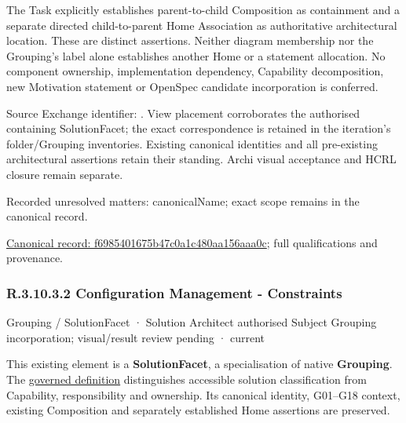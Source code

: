 The Task explicitly establishes parent-to-child Composition as containment and
a separate directed child-to-parent Home Association as authoritative architectural
location. These are distinct assertions. Neither diagram membership nor the
Grouping's label alone establishes another Home or a statement allocation.
No component ownership, implementation dependency, Capability decomposition,
new Motivation statement or OpenSpec candidate incorporation is conferred.



Source Exchange identifier: \texttt{}. View placement corroborates
the authorised containing SolutionFacet; the exact correspondence is retained in the
iteration's folder/Grouping inventories. Existing canonical identities and all
pre-existing architectural assertions retain their standing. Archi visual
acceptance and HCRL closure remain separate.


{\small Recorded unresolved matters: canonicalName; exact scope remains in the canonical record.}\par
{\footnotesize \href{../../../../../../../continuum/grouping/f6985401675b47c0a1c480aa156aaa0c.md}{Canonical record: f6985401675b47c0a1c480aa156aaa0c}; full qualifications and provenance.}\par
\subsubsection*{R.3.10.3.2 Configuration Management - Constraints}
\label{navigation:R.3.10.3.2}

\label{element:5f25a2e8082d486d8f2b87aec6667e33}
{\small Grouping / SolutionFacet · Solution Architect authorised Subject Grouping incorporation; visual/result review pending · current}\par

This existing element is a \textbf{SolutionFacet}, a specialisation of native
\textbf{Grouping}. The \href{\detokenize{../../../../../../../governance/continuum-representation.md#solutionfacet-classification--1119-candidate}}{governed definition}
distinguishes accessible solution classification from Capability, responsibility
and ownership. Its canonical identity, G01–G18 context, existing Composition
and separately established Home assertions are preserved.



